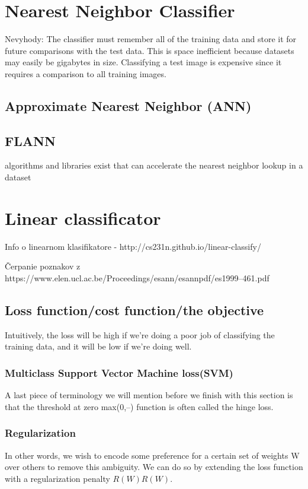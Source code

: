 \documentclass[10pt,a4paper]{article}
\begin{document}
\section{Nearest Neighbor Classifier}

Nevyhody:
The classifier must remember all of the training data and store it for future comparisons with the test data. This is space inefficient because datasets may easily be gigabytes in size.
Classifying a test image is expensive since it requires a comparison to all training images.

\subsection{Approximate Nearest Neighbor (ANN)}

\subsection{FLANN}
algorithms and libraries exist that can accelerate the nearest neighbor lookup in a dataset



\section{Linear classificator}
Info o linearnom klasifikatore - http://cs231n.github.io/linear-classify/

Čerpanie poznakov z https://www.elen.ucl.ac.be/Proceedings/esann/esannpdf/es1999--461.pdf

\subsection{Loss function/cost function/the objective}
Intuitively, the loss will be high if we’re doing a poor job of classifying the training data, and it will be low if we’re doing well.

\subsubsection{Multiclass Support Vector Machine loss(SVM)}
A last piece of terminology we will mention before we finish with this section is that the threshold at zero max(0,--) function is often called the hinge loss.

\subsubsection{Regularization}
In other words, we wish to encode some preference for a certain set of weights W over others to remove this ambiguity. We can do so by extending the loss function with a regularization penalty $R(W)R(W)$.
\end{document}
